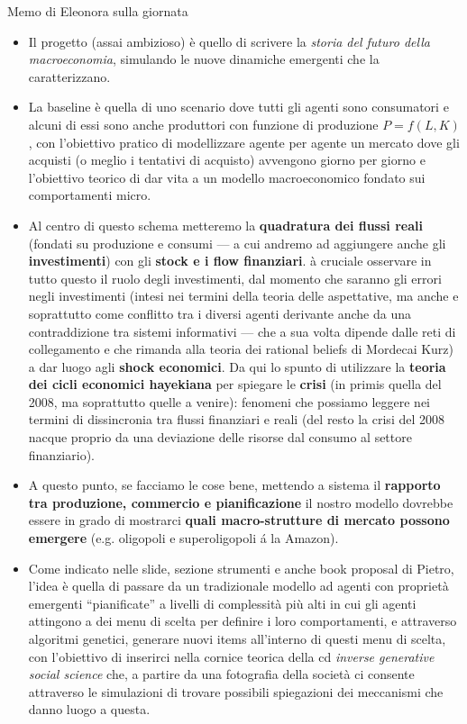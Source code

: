 \documentclass[9pt]{beamer}
\begin{document}
\begin{frame}{Memo di Eleonora sulla giornata}

\scriptsize


\begin{itemize}

\item
Il progetto (assai ambizioso) \`{e} quello di scrivere la \emph{storia del futuro della macroeconomia}, simulando le nuove dinamiche emergenti che la caratterizzano.

\item
La baseline \`{e} quella di uno scenario dove tutti gli agenti sono consumatori e alcuni di essi sono anche produttori con funzione di produzione $P=f(L,K)$, con l'obiettivo pratico di modellizzare agente per agente un mercato dove gli acquisti (o meglio i tentativi di acquisto) avvengono giorno per giorno e l'obiettivo teorico di dar vita a un modello macroeconomico fondato sui comportamenti micro.

\item
Al centro di questo schema metteremo la \textbf{quadratura dei flussi reali} (fondati su produzione e consumi --- a cui andremo ad aggiungere anche gli \textbf{investimenti}) con gli \textbf{stock e i flow finanziari}. \`{a} cruciale osservare in tutto questo il ruolo degli investimenti, dal momento che saranno gli errori negli investimenti (intesi nei termini della teoria delle aspettative, ma anche e soprattutto come conflitto tra i diversi agenti derivante anche da una contraddizione tra sistemi informativi --- che a sua volta dipende dalle reti di collegamento e che rimanda alla teoria dei rational beliefs di Mordecai Kurz) a dar luogo agli \textbf{shock economici}. Da qui lo spunto di utilizzare la \textbf{teoria dei cicli economici hayekiana} per spiegare le \textbf{crisi} (in primis quella del 2008, ma soprattutto quelle a venire): fenomeni che possiamo leggere nei termini di dissincronia tra flussi finanziari e reali (del resto la crisi del 2008 nacque proprio da una deviazione delle risorse dal consumo al settore finanziario).

\item
A questo punto, se facciamo le cose bene, mettendo a sistema il \textbf{rapporto tra produzione, commercio e pianificazione} il nostro modello dovrebbe essere in grado di mostrarci \textbf{quali macro-strutture di mercato possono emergere} (e.g. oligopoli e superoligopoli \'{a} la Amazon).

\item
Come indicato nelle slide, sezione strumenti e anche book proposal di Pietro, l'idea \`{e} quella di passare da un tradizionale modello ad agenti con propriet\`{a} emergenti ``pianificate'' a livelli di complessit\`{a} pi\`{u} alti in cui gli agenti attingono a dei menu di scelta per definire i loro comportamenti, e attraverso algoritmi genetici, generare nuovi items all'interno di questi menu di scelta, con l'obiettivo di inserirci nella cornice teorica della cd \emph{inverse generative social science} che, a partire da una fotografia della società ci consente attraverso le simulazioni di trovare possibili spiegazioni dei meccanismi che danno luogo a questa.


\end{itemize}
\end{frame}
\end{document}
